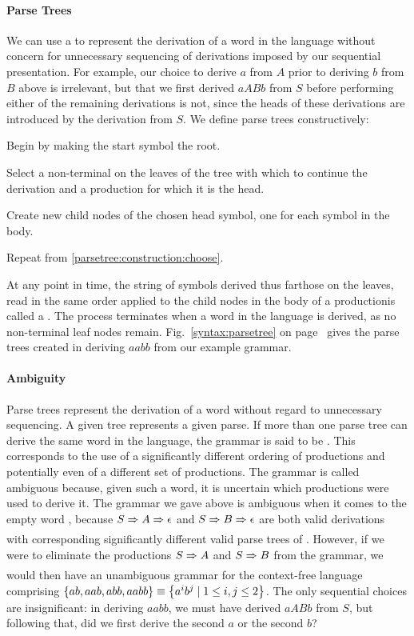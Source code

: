 \paragraph{Parse Trees} We can use a  to represent the derivation of a word in the language without concern for unnecessary sequencing of derivations imposed by our sequential presentation. For example, our choice to derive $a$ from $A$ prior to deriving $b$ from $B$ above is irrelevant, but that we first derived $aABb$ from $S$ before performing either of the remaining derivations is not, since the heads of these derivations are introduced by the derivation from $S$. We define parse trees constructively: 
\begin{aenumerate}
\item Begin by making the start symbol the root.
\item\label{parsetree:construction:choose} Select a non-terminal on the leaves of the tree with which to continue the derivation and a production for which it is the head.
\item Create new child nodes of the chosen head symbol, one for each symbol in the body.
\item Repeat from \ref{parsetree:construction:choose}.
\end{aenumerate}
At any point in time, the string of symbols derived thus far\empause those on the leaves, read in the same order applied to the child nodes in the body of a production\empause is called a . The process terminates when a word in the language is derived, as no non-terminal leaf nodes remain. Fig.~\ref{syntax:parsetree} on page~\pageref{syntax:parsetree} gives the parse trees created in deriving $aabb$ from our example grammar.



\paragraph{Ambiguity} Parse trees represent the derivation of a word without regard to unnecessary sequencing. A given tree represents a given parse. If more than one parse tree can derive the same word in the language, the grammar is said to be . This corresponds to the use of a significantly different ordering of productions and potentially even of a different set of productions. The grammar is called ambiguous because, given such a word, it is uncertain which productions were used to derive it. The grammar we gave above is ambiguous when it comes to the empty word \emptyword, because $S \derives A \derives \emptyword$ and $S \derives B \derives \emptyword$ are both valid derivations with corresponding significantly different valid parse trees of \emptyword. However, if we were to eliminate the productions $S \derives A$ and $S \derives B$ from the grammar, we would then have an unambiguous grammar for the context-free language comprising $\left\{ ab, aab, abb, aabb \right\} \equiv \left\{ a^{i}b^{j} \mid 1 \leq i, j \leq 2 \right\}$. The only sequential choices are insignificant: in deriving $aabb$, we must have derived $aABb$ from $S$, but following that, did we first derive the second $a$ or the second $b$?

